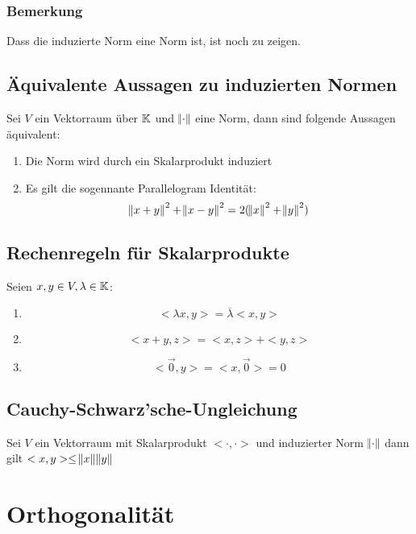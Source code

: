 \subsubsection{Bemerkung}
Dass die induzierte Norm eine Norm ist, ist noch zu zeigen.

\subsection{Äquivalente Aussagen zu induzierten Normen}
Sei $V$ ein Vektorraum über $\mathbb{K}$ und $\norm{\cdot}$ eine Norm, dann sind folgende
Aussagen äquivalent:
\begin{enumerate}
	\item Die Norm wird durch ein Skalarprodukt induziert
	\item Es gilt die sogennante Parallelogram Identität:
		\begin{equation*}
			{\norm{x+y}}^2 + {\norm{x-y}}^2 = 2(\norm{x}^2 + \norm{y}^2)
		\end{equation*}
\end{enumerate}

\subsection{Rechenregeln für Skalarprodukte}
Seien $x,y \in V, \lambda \in \mathbb{K}$:
\begin{enumerate}
	\item
		\begin{equation*}
			<\lambda x, y>  = \overline{\lambda} <x,y>
		\end{equation*} 
	\item 
		\begin{equation*}
			<x+y, z> = <x,z> + <y,z>
		\end{equation*}
	\item
		\begin{equation*}
			<\vec{0}, y> = <x, \vec{0}> = 0
		\end{equation*}
\end{enumerate}

\subsection{Cauchy-Schwarz'sche-Ungleichung}
Sei $V$ ein Vektorraum mit Skalarprodukt $<\cdot, \cdot>$ und induzierter Norm
$\norm{\cdot}$ dann gilt $<x,y>\leq\norm{x}\norm{y}$

\section{Orthogonalität}
